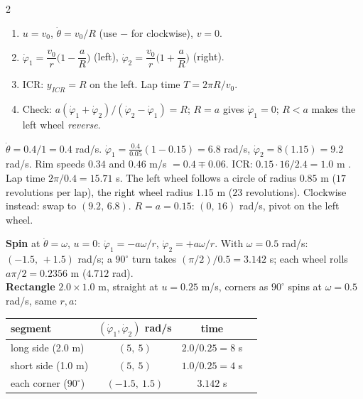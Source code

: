 \begin{multicols}{2}
\columnbreak
{}
\begin{recipe}
\begin{enumerate}
\item $u=v_0$, $\dot\theta=v_0/R$ (use $-$ for clockwise), $v=0$.
\item $\dot\varphi_1=\dfrac{v_0}{r}\Big(1-\dfrac aR\Big)$ (left), $\dot\varphi_2=\dfrac{v_0}{r}\Big(1+\dfrac aR\Big)$ (right).
\item ICR: $y_{ICR}=R$ on the left. Lap time $T=2\pi R/v_0$.
\item Check: $a(\dot\varphi_1+\dot\varphi_2)/(\dot\varphi_2-\dot\varphi_1)=R$; $R=a$ gives $\dot\varphi_1=0$; $R<a$ makes the left wheel \emph{reverse}.
\end{enumerate}
\end{recipe}
\begin{worked}[circle: $r=0.05$ m, $a=0.15$ m, $R=1$ m, $v_0=0.4$ m/s \chk]
$\dot\theta=0.4/1=0.4$ rad/s. $\dot\varphi_1=\frac{0.4}{0.05}(1-0.15)=\mathbf{6.8}$ rad/s, $\dot\varphi_2=8(1.15)=\mathbf{9.2}$ rad/s. Rim speeds $0.34$ and $0.46$ m/s $=0.4\mp0.06$. ICR: $0.15\cdot16/2.4=1.0$ m \checkmark. Lap time $2\pi/0.4=\mathbf{15.71}$ s. The left wheel follows a circle of radius $0.85$ m ($17$ revolutions per lap), the right wheel radius $1.15$ m ($23$ revolutions). Clockwise instead: swap to $(9.2,\,6.8)$. $R=a=0.15$: $(0,\,16)$ rad/s, pivot on the left wheel.
\end{worked}
\begin{worked}
\textbf{Spin} at $\dot\theta=\omega$, $u=0$: $\dot\varphi_1=-a\omega/r$, $\dot\varphi_2=+a\omega/r$. With $\omega=0.5$ rad/s: $(-1.5,\,+1.5)$ rad/s; a $90^\circ$ turn takes $(\pi/2)/0.5=3.142$ s; each wheel rolls $a\pi/2=0.2356$ m ($4.712$ rad).\\
\textbf{Rectangle} $2.0\times1.0$ m, straight at $u=0.25$ m/s, corners as $90^\circ$ spins at $\omega=0.5$ rad/s, same $r,a$:
\begin{center}\small\begin{tabular}{@{}lccc@{}}\toprule
segment & $(\dot\varphi_1,\dot\varphi_2)$ rad/s & time\\\midrule
long side (2.0 m) & $(5,\ 5)$ & $2.0/0.25=8$ s\\
short side (1.0 m) & $(5,\ 5)$ & $1.0/0.25=4$ s\\
each corner ($90^\circ$) & $(-1.5,\ 1.5)$ & $3.142$ s\\\bottomrule\end{tabular}\end{center}

\end{worked}
\end{multicols}
